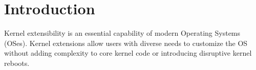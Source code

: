 \section{Introduction}
\vspace{-5pt}


Kernel extensibility is an essential capability of modern
    Operating Systems (OSes).
Kernel extensions allow users with diverse needs to customize the OS without
    adding complexity to core kernel code or introducing disruptive
    kernel reboots.

